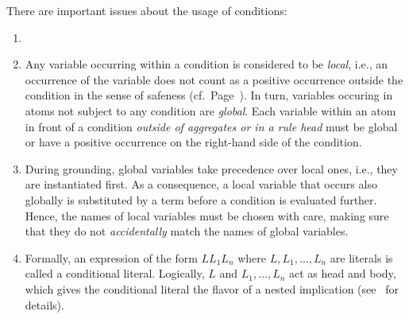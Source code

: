 \begin{Note}
There are  important issues about the usage of conditions:
\begin{enumerate}
\item 
{}
%
\item Any variable occurring within a condition is considered to be \emph{local},
i.e., 
an occurrence of the variable 
does not count as a positive occurrence outside the condition
in the sense of safeness (cf.\ Page~\pageref{pg:safe}).
In turn, variables occuring in atoms not subject to any
condition are \emph{global}. 
Each variable within an atom in front of a condition 
\emph{outside of aggregates or in a rule head} 
must be global or have a positive occurrence on the right-hand side of
the condition.
%
\item 
During grounding,
global variables take precedence over local ones, i.e.,
they are instantiated first.
As a consequence, a local variable that occurs also globally is substituted by a term
before a condition is evaluated further.
Hence, the names of local variables must be chosen with care,
making sure that they do not \emph{accidentally} match the names of global variables.
%
\item 
Formally,
an expression of the form
$L$\code{:}$L_1$\code{,\dots,}$L_n$
where $L,L_1,\dots,L_n$ are literals
is called a conditional literal.
Logically, $L$ and $L_1,\dots,L_n$ act as head and body,
which gives the conditional literal the flavor of a nested implication
(see~\cite{haliya14a} for details).
%
\end{enumerate}
\end{Note}

